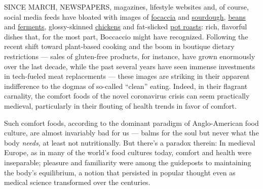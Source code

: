 SINCE MARCH, NEWSPAPERS, magazines, lifestyle websites and, of course,
social media feeds have bloated with images of
\href{https://www.nytimes3xbfgragh.onion/2020/04/24/dining/focaccia-bread.html}{focaccia}
and
\href{https://www.nytimes3xbfgragh.onion/2020/04/11/science/sourdough-bread-starter-library.html}{sourdough},
\href{https://www.nytimes3xbfgragh.onion/2020/03/22/business/coronavirus-beans-sales.html}{beans}
and
\href{https://www.nytimes3xbfgragh.onion/2020/04/07/realestate/home-farming-tips-coronavirus.html}{ferments},
glossy-skinned
\href{https://www.nytimes3xbfgragh.onion/2020/07/03/dining/the-most-delicious-chicken.html}{chickens}
and fat-slicked
\href{https://cooking.nytimes3xbfgragh.onion/recipes/1020845-slow-cooker-pot-roast}{pot
roasts}: rich, flavorful dishes that, for the most part, Boccaccio might
have recognized. Following the recent shift toward plant-based cooking
and the boom in boutique dietary restrictions --- sales of gluten-free
products, for instance, have grown enormously over the last decade,
while the past several years have seen immense investments in
tech-fueled meat replacements --- these images are striking in their
apparent indifference to the dogmas of so-called ``clean'' eating.
Indeed, in their flagrant carnality, the comfort foods of the novel
coronavirus crisis can seem practically medieval, particularly in their
flouting of health trends in favor of comfort.

Such comfort foods, according to the dominant paradigm of Anglo-American
food culture, are almost invariably bad for us --- balms for the soul
but never what the body \emph{needs,} at least not nutritionally. But
there's a paradox therein: In medieval Europe, as in many of the world's
food cultures today, comfort and health were inseparable; pleasure and
familiarity were among the guideposts to maintaining the body's
equilibrium, a notion that persisted in popular thought even as medical
science transformed over the centuries.

